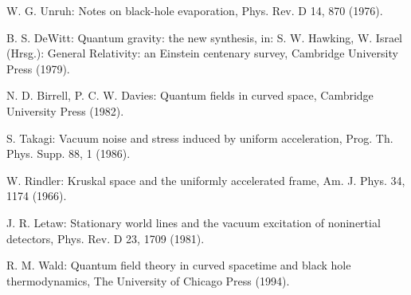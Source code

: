 \documentclass[a4paper,12pt]{article}
\begin{document}
\begin{thebibliography}{99}


 W. G. Unruh: Notes on black-hole evaporation, Phys. Rev. D 14,
870 (1976).

 B. S. DeWitt: Quantum gravity: the new synthesis, in:
  S. W. Hawking, W. Israel (Hrsg.): General Relativity: an Einstein centenary
  survey, Cambridge University Press (1979).

 N. D. Birrell, P. C. W. Davies: Quantum fields in curved space,
Cambridge University Press (1982).

 S. Takagi: Vacuum noise and stress induced by uniform 
  acceleration, Prog. Th. Phys. Supp. 88, 1 (1986).

 W. Rindler: Kruskal space and the uniformly accelerated frame,
  Am. J. Phys. 34, 1174 (1966).

 J. R. Letaw: Stationary world lines and the vacuum excitation 
of noninertial detectors, Phys. Rev. D 23, 1709 (1981).

 R. M. Wald: Quantum field theory in curved spacetime and black
hole thermodynamics, The University of Chicago Press (1994).




\end{thebibliography}
\end{document}
